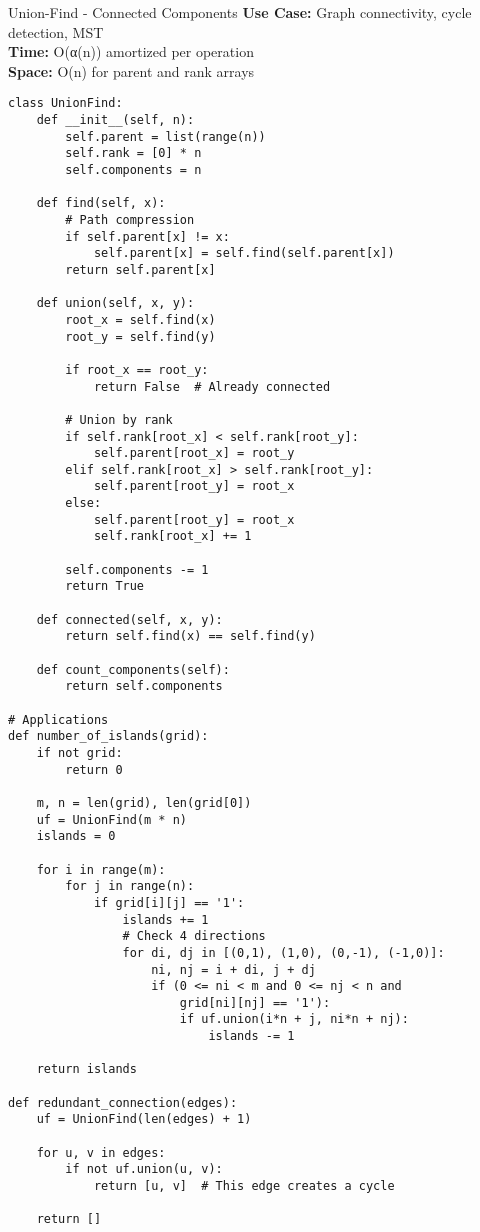 \documentclass[10pt,a4paper]{article}
\begin{document}
\begin{patternbox}{Union-Find - Connected Components}
\textbf{Use Case:} Graph connectivity, cycle detection, MST\\
\textbf{Time:} O(α(n)) amortized per operation\\
\textbf{Space:} O(n) for parent and rank arrays
\end{patternbox}

\begin{lstlisting}
class UnionFind:
    def __init__(self, n):
        self.parent = list(range(n))
        self.rank = [0] * n
        self.components = n

    def find(self, x):
        # Path compression
        if self.parent[x] != x:
            self.parent[x] = self.find(self.parent[x])
        return self.parent[x]

    def union(self, x, y):
        root_x = self.find(x)
        root_y = self.find(y)

        if root_x == root_y:
            return False  # Already connected

        # Union by rank
        if self.rank[root_x] < self.rank[root_y]:
            self.parent[root_x] = root_y
        elif self.rank[root_x] > self.rank[root_y]:
            self.parent[root_y] = root_x
        else:
            self.parent[root_y] = root_x
            self.rank[root_x] += 1

        self.components -= 1
        return True

    def connected(self, x, y):
        return self.find(x) == self.find(y)

    def count_components(self):
        return self.components

# Applications
def number_of_islands(grid):
    if not grid:
        return 0

    m, n = len(grid), len(grid[0])
    uf = UnionFind(m * n)
    islands = 0

    for i in range(m):
        for j in range(n):
            if grid[i][j] == '1':
                islands += 1
                # Check 4 directions
                for di, dj in [(0,1), (1,0), (0,-1), (-1,0)]:
                    ni, nj = i + di, j + dj
                    if (0 <= ni < m and 0 <= nj < n and
                        grid[ni][nj] == '1'):
                        if uf.union(i*n + j, ni*n + nj):
                            islands -= 1

    return islands

def redundant_connection(edges):
    uf = UnionFind(len(edges) + 1)

    for u, v in edges:
        if not uf.union(u, v):
            return [u, v]  # This edge creates a cycle

    return []
\end{lstlisting}
\end{document}
